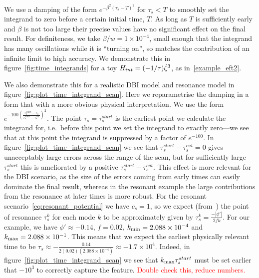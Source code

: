 We use a damping of the form $e^{-\beta^2{(\tau_s-T)}^2}$ for $\tau_s<T$ to smoothly
set the integrand to zero before a certain initial time, $T$.
As long as $T$ is sufficiently early and $\beta$ is not too large
their precise values have no significant effect on the final result.
For definiteness, we take $\beta/w=1\times10^{-4}$, small enough that
the integrand has many oscillations while it is ``turning on'',
so matches the contribution of an infinite limit to high accuracy.
We demonstrate this in figure~\ref{fig:time_integrands}
for a toy $H_{int}=(-1/\tau)\dot{\zeta}^3$,
as in~\eqref{example_eft2}.


We also demonstrate this for a realistic DBI model and resonance model
in figure~\ref{fig:plot_time_integrand_scan}.
Here we reparametrise the damping in a form that with a more obvious physical
interpretation.
We use the form $e^{-100{\left(\frac{{\tau_s^{start}-\tau_s}}{\tau_s^{start}-\tau_s^{cut}}\right)}^2}$.
The point $\tau_s=\tau_s^{start}$ is the earliest point we calculate the integrand for,
i.e.\ before this point we set the integrand to exactly zero---we
see that at this point the integrand is suppressed by a factor of $e^{-100}$.
In figure~\ref{fig:plot_time_integrand_scan} we see that $\tau_s^{start}-\tau_s^{cut}=0$
gives unacceptably large errors across the range of the scan, but for sufficiently large
$\tau_s^{start}$ this is ameliorated by a positive $\tau_s^{start}-\tau_s^{cut}$.
This effect is more relevant for the DBI scenario, as the size of the errors coming
from early times can easily dominate the final result, whereas in the resonant example
the large contributions from the resonance at later times is more robust.
For the resonant scenario~\eqref{eq:resonant_potential} we have $c_s=1$,
so we expect (from~\cite{flauger_pajer_resonant}) the point of resonance $\tau^k_s$
for each mode $k$ to be approximately given by $\tau^k_s = \frac{-\left|\phi'\right|}{2fk}$.
For our example, we have $\phi'\approx-0.14$, $f=0.02$, ${k_\text{min}}=2.088\times10^{-4}$ and ${k_\text{max}}=2.088\times10^{-1}$.
This means that we expect the earliest physically relevant time to be
$\tau_s\approx-\frac{0.14}{2(0.02)(2.088\times10^{-4})}\approx-1.7\times10^{4}$.
Indeed, in figure~\ref{fig:plot_time_integrand_scan} we see that ${k_\text{max}}\tau_s^{start}$ must be
set earlier that $-10^3$ to correctly capture the feature.
\textcolor{red}{Double check this, reduce numbers.}


